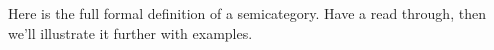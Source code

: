 Here is the full formal definition of a semicategory.
Have a read through, then we'll illustrate it further with examples.
